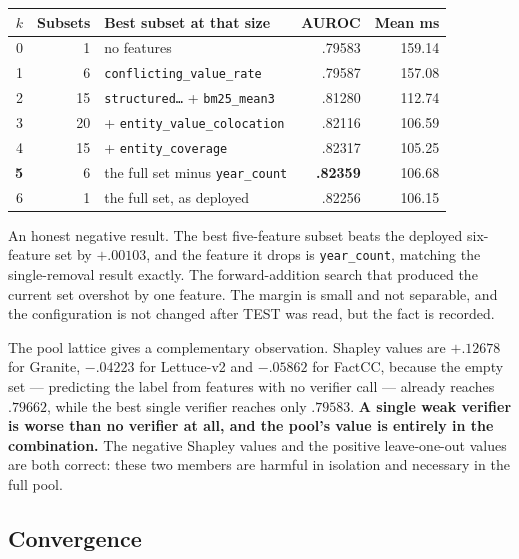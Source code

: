 \documentclass[10pt,a4paper]{article}
\newcommand{\fix}[1]{\textcolor{red!65!black}{#1}}
\begin{document}
\begin{center}\small
\begin{tabular}{rrlrr}
\toprule
$k$ & Subsets & Best subset at that size & AUROC & Mean ms \\
\midrule
0 & 1 & no features & .79583 & 159.14 \\
1 & 6 & \texttt{conflicting\_value\_rate} & .79587 & 157.08 \\
2 & 15 & \texttt{structured\ldots} + \texttt{bm25\_mean3} & .81280 & 112.74 \\
3 & 20 & + \texttt{entity\_value\_colocation} & .82116 & 106.59 \\
4 & 15 & + \texttt{entity\_coverage} & .82317 & 105.25 \\
\textbf{5} & 6 & the full set minus \texttt{year\_count} & \textbf{.82359} & 106.68 \\
6 & 1 & the full set, as deployed & .82256 & 106.15 \\
\bottomrule
\end{tabular}
\end{center}

\fix{An honest negative result.} The best five-feature subset beats the deployed six-feature set
by $+.00103$, and the feature it drops is \texttt{year\_count}, matching the single-removal result
exactly. The forward-addition search that produced the current set overshot by one feature. The
margin is small and not separable, and the configuration is not changed after TEST was read, but
the fact is recorded.

The pool lattice gives a complementary observation. Shapley values are $+.12678$ for Granite,
$-.04223$ for Lettuce-v2 and $-.05862$ for FactCC, because the empty set --- predicting the label
from features with no verifier call --- already reaches $.79662$, while the best single verifier
reaches only $.79583$. \textbf{A single weak verifier is worse than no verifier at all, and the
pool's value is entirely in the combination.} The negative Shapley values and the positive
leave-one-out values are both correct: these two members are harmful in isolation and necessary in
the full pool.

\subsection{Convergence}
\label{sec:conv}
\end{document}
